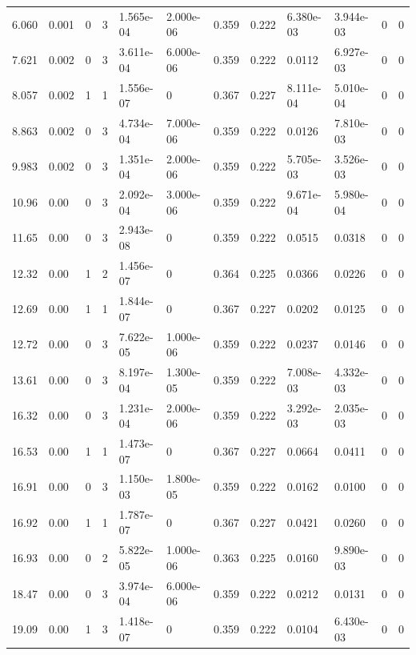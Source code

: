 \documentclass[preview]{standalone}
\begin{document}
{{\begin{tabular}{L{1.2cm}C{1.2cm} C{0.3cm}C{0.5cm} C{1.4cm}C{1.4cm} C{1.4cm}C{1.4cm} C{1.6cm}C{1.6cm} C{1.6cm}C{1.6cm}}
  6.060  &  0.001  & 0     &  3 &  1.565e-04  & 2.000e-06  &  0.359&   0.222& 6.380e-03 & 3.944e-03   &  0 & 0  \\ 
  7.621  &  0.002  & 0     &  3 &  3.611e-04  & 6.000e-06  &  0.359&   0.222& 0.0112 & 6.927e-03   &  0 & 0  \\ 
  8.057  &  0.002  & 1     &  1 &  1.556e-07  & 0  &  0.367&   0.227& 8.111e-04 & 5.010e-04   &  0 & 0  \\ 
  8.863  &  0.002  & 0     &  3 &  4.734e-04  & 7.000e-06  &  0.359&   0.222& 0.0126 & 7.810e-03   &  0 & 0  \\ 
  9.983  &  0.002  & 0     &  3 &  1.351e-04  & 2.000e-06  &  0.359&   0.222& 5.705e-03 & 3.526e-03   &  0 & 0  \\ 
  10.96  &  0.00  & 0     &  3 &  2.092e-04  & 3.000e-06  &  0.359&   0.222& 9.671e-04 & 5.980e-04   &  0 & 0  \\ 
  11.65  &  0.00  & 0     &  3 &  2.943e-08  & 0  &  0.359&   0.222& 0.0515 & 0.0318   &  0 & 0  \\ 
  12.32  &  0.00  & 1     &  2 &  1.456e-07  & 0  &  0.364&   0.225& 0.0366 & 0.0226   &  0 & 0  \\ 
  12.69  &  0.00  & 1     &  1 &  1.844e-07  & 0  &  0.367&   0.227& 0.0202 & 0.0125   &  0 & 0  \\ 
  12.72  &  0.00  & 0     &  3 &  7.622e-05  & 1.000e-06  &  0.359&   0.222& 0.0237 & 0.0146   &  0 & 0  \\ 
  13.61  &  0.00  & 0     &  3 &  8.197e-04  & 1.300e-05  &  0.359&   0.222& 7.008e-03 & 4.332e-03   &  0 & 0  \\ 
  16.32  &  0.00  & 0     &  3 &  1.231e-04  & 2.000e-06  &  0.359&   0.222& 3.292e-03 & 2.035e-03   &  0 & 0  \\ 
  16.53  &  0.00  & 1     &  1 &  1.473e-07  & 0  &  0.367&   0.227& 0.0664 & 0.0411   &  0 & 0  \\ 
  16.91  &  0.00  & 0     &  3 &  1.150e-03  & 1.800e-05  &  0.359&   0.222& 0.0162 & 0.0100   &  0 & 0  \\ 
  16.92  &  0.00  & 1     &  1 &  1.787e-07  & 0  &  0.367&   0.227& 0.0421 & 0.0260   &  0 & 0  \\ 
  16.93  &  0.00  & 0     &  2 &  5.822e-05  & 1.000e-06  &  0.363&   0.225& 0.0160 & 9.890e-03   &  0 & 0  \\ 
  18.47  &  0.00  & 0     &  3 &  3.974e-04  & 6.000e-06  &  0.359&   0.222& 0.0212 & 0.0131   &  0 & 0  \\ 
  19.09  &  0.00  & 1     &  3 &  1.418e-07  & 0  &  0.359&   0.222& 0.0104 & 6.430e-03   &  0 & 0  \\ 

\end{tabular}}}
\end{document}
